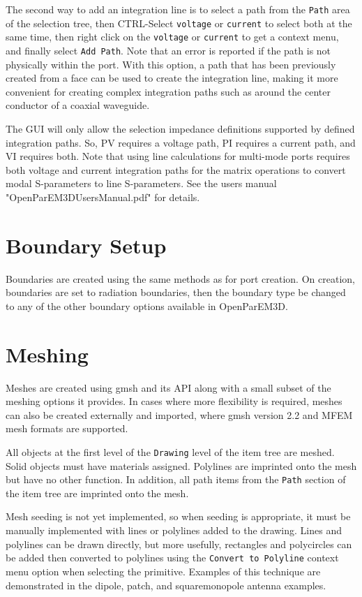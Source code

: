 \documentclass[titlepage]{article}
\renewcommand\_{\textunderscore\linebreak[1]}
\begin{document}
The second way to add an integration line is to select a path from the \texttt{Path} area of the selection tree, then CTRL-Select \texttt{voltage} or \texttt{current} to select both at the same time, then right click on the \texttt{voltage} or \texttt{current} to get a context menu, and finally select \texttt{Add Path}.  Note that an error is reported if the path is not physically within the port.  With this option, a path that has been previously created from a face can be used to create the integration line, making it more convenient for creating complex integration paths such as around the center conductor of a coaxial waveguide. 

The GUI will only allow the selection impedance definitions supported by defined integration paths.  So, PV requires a voltage path, PI requires a current path, and VI requires both.  Note that using line calculations for multi-mode ports requires both voltage and current integration paths for the matrix operations to convert modal S-parameters to line S-parameters.  See the users manual "OpenParEM3D\_Users\_Manual.pdf" for details.

\section{Boundary Setup}

Boundaries are created using the same methods as for port creation.  On creation, boundaries are set to radiation boundaries, then the boundary type be changed to any of the other boundary options available in OpenParEM3D.

\section{Meshing}

Meshes are created using gmsh and its API along with a small subset of the meshing options it provides.  In cases where more flexibility is required,  meshes can also be created externally and imported, where gmsh version 2.2 and MFEM mesh formats are supported. 

All objects at the first level of the \texttt{Drawing} level of the item tree are meshed.  Solid objects must have materials assigned.  Polylines are imprinted onto the mesh but have no other function.  In addition, all path items from the \texttt{Path} section of the item tree are imprinted onto the mesh.

Mesh seeding is not yet implemented, so when seeding is appropriate, it must be manually implemented with lines or polylines added to the drawing.  Lines and polylines can be drawn directly, but more usefully, rectangles and polycircles can be added then converted to polylines using the \texttt{Convert to Polyline} context menu option when selecting the primitive.  Examples of this technique are demonstrated in the dipole, patch, and square\_monopole antenna examples.
\end{document}

